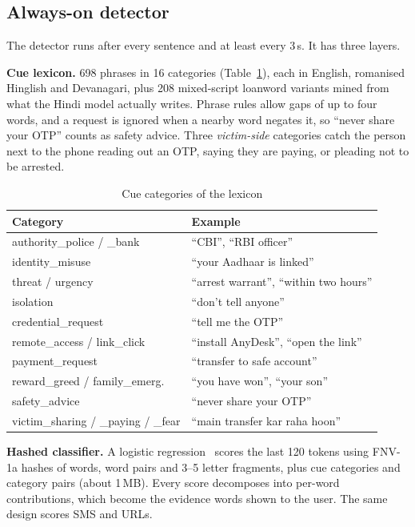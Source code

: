 \documentclass[conference]{IEEEtran}
\begin{document}
\subsection{Always-on detector}\label{sec:det}
The detector runs after every sentence and at least every 3\,s. It has three layers.

\textbf{Cue lexicon.} 698 phrases in 16 categories (Table~\ref{tab:cues}), each in English, romanised Hinglish and Devanagari, plus 208 mixed-script loanword variants mined from what the Hindi model actually writes. Phrase rules allow gaps of up to four words, and a request is ignored when a nearby word negates it, so ``never share your OTP'' counts as safety advice. Three \emph{victim-side} categories catch the person next to the phone reading out an OTP, saying they are paying, or pleading not to be arrested.

\begin{table}[t]
\caption{Cue categories of the lexicon}
\label{tab:cues}
\centering
\footnotesize
\setlength{\tabcolsep}{3pt}
\begin{tabular}{@{}ll@{}}
\toprule
Category & Example \\
\midrule
authority\_police / \_bank & ``CBI'', ``RBI officer'' \\
identity\_misuse & ``your Aadhaar is linked'' \\
threat / urgency & ``arrest warrant'', ``within two hours'' \\
isolation & ``don't tell anyone'' \\
credential\_request & ``tell me the OTP'' \\
remote\_access / link\_click & ``install AnyDesk'', ``open the link'' \\
payment\_request & ``transfer to safe account'' \\
reward\_greed / family\_emerg. & ``you have won'', ``your son'' \\
safety\_advice & ``never share your OTP'' \\
victim\_sharing / \_paying / \_fear & ``main transfer kar raha hoon'' \\
\bottomrule
\end{tabular}
\end{table}

\textbf{Hashed classifier.} A logistic regression~\cite{hashing} scores the last 120 tokens using FNV-1a hashes of words, word pairs and 3--5 letter fragments, plus cue categories and category pairs (about 1\,MB). Every score decomposes into per-word contributions, which become the evidence words shown to the user. The same design scores SMS and URLs.
\end{document}
